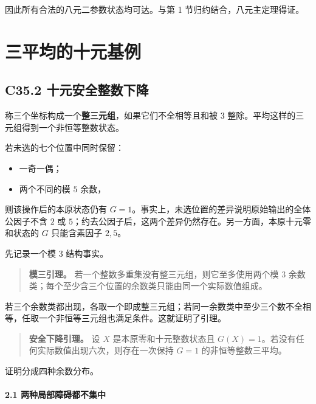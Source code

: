 {因此所有合法的八元二参数状态均可达。与第} {1} {节归约结合，八元主定理得证。}


\section{三平均的十元基例}\label{construct:triple-ten}
\subsection*{\texorpdfstring{{C35.2} {十元安全整数下降}}{C35.2 十元安全整数下降}}\label{C35-h230}

{称三个坐标构成一个}\textbf{{整三元组}}{，如果它们不全相等且和被} \(3\) {整除。平均这样的三元组得到一个非恒等整数状态。}

{若未选的七个位置中同时保留：}

\begin{itemize}
\tightlist
\item
  {一奇一偶；}
\item
  {两个不同的模} \(5\) {余数，}
\end{itemize}

{则该操作后的本原状态仍有} \(G=1\){。事实上，未选位置的差异说明原始输出的全体公因子不含} \(2\) {或} \(5\){；约去公因子后，这两个差异仍然存在。另一方面，本原十元零和状态的} \(G\) {只能含素因子} \(2,5\){。}

{先记录一个模} \(3\) {结构事实。}

\begin{quote}
\textbf{{模三引理。}} {若一个整数多重集没有整三元组，则它至多使用两个模} \(3\) {余数类；每个至少含三个位置的余数类只能由同一个实际数值组成。}
\end{quote}

{若三个余数类都出现，各取一个即成整三元组；若同一余数类中至少三个数不全相等，任取一个非恒等三元组也满足条件。这就证明了引理。}

\begin{quote}
\textbf{{安全下降引理。}} {设} \(X\) {是本原零和十元整数状态且} \(G(X)=1\){。若没有任何实际数值出现六次，则存在一次保持} \(G=1\) {的非恒等整数三平均。}
\end{quote}

{证明分成四种余数分布。}

\paragraph*{\texorpdfstring{{2.1} {两种局部障碍都不集中}}{2.1 两种局部障碍都不集中}}\label{C35-h231}


